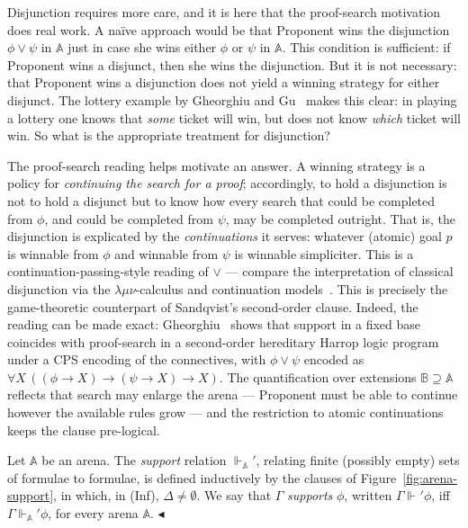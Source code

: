 \documentclass{lipics-v2021}
\newcommand{\fillBox}{\hfill$\blacktriangleleft$}
\newcommand{\supp}[1]{\Vdash_{#1}}
\newcommand{\arenasupp}[1]{\Vdash_{#1}'}  %
\newcommand{\arena}[1]{\mathbb{#1}}                     %
\begin{document}
Disjunction requires more care, and it is here that the proof-search motivation
does real work. A na\"ive approach would be that Proponent wins the disjunction $\phi \lor \psi$ in $\arena{A}$
just in case she wins either $\phi$ or $\psi$ in $\arena{A}$.
This condition is sufficient: if Proponent wins a disjunct, then she wins the disjunction. But it is not necessary: that Proponent wins a
disjunction does not yield a winning strategy for either disjunct. The lottery example by Gheorghiu and Gu~\cite{Gheorghiu2026KnowledgeBases} makes this clear: in playing a lottery one knows that \emph{some} ticket will win, but does not know \emph{which} ticket will win. So what is the appropriate treatment for disjunction?
 
The
proof-search reading helps motivate an answer. A winning strategy
is a policy for \emph{continuing the search for a proof}; accordingly, to hold a
disjunction is not to hold a disjunct but to know how every search that could
be completed from $\phi$, and could be completed from $\psi$, may be
completed outright. That is, the disjunction is explicated by the
\emph{continuations} it serves: whatever (atomic) goal $p$ is winnable from
$\phi$ and winnable from $\psi$ is winnable simpliciter. This is a
continuation-passing-style reading of $\lor$ --- compare the interpretation
of classical disjunction via the $\lambda\mu\nu$-calculus and continuation
models~\cite{PYM2001315,Pym_ReductiveLogic}. This is precisely the game-theoretic
counterpart of Sandqvist's second-order clause. Indeed, the reading can be
made exact: Gheorghiu~\cite{Gheorghiu2026SupportIsSearch} shows that support
in a fixed base coincides with proof-search in a second-order hereditary
Harrop logic program under a CPS encoding of the connectives, with
$\phi \lor \psi$ encoded as
$\forall X\,((\phi \to X) \to (\psi \to X) \to X)$. The quantification over
extensions $\arena{B} \supseteq \arena{A}$ reflects that search may enlarge
the arena --- Proponent must be able to continue however the available rules
grow --- and the restriction to atomic continuations keeps the clause
pre-logical.
\begin{definition}
\label{def:support_in_arena}
Let $\arena{A}$ be an arena. The \emph{support} relation
$\arenasupp{\arena{A}}$, relating finite (possibly empty) sets of formulae to
formulae, is defined inductively by the clauses of
Figure~\ref{fig:arena-support}, in which, in (Inf), $\Delta \neq \emptyset$. We say that
$\Gamma$ \emph{supports} $\phi$, written $\Gamma \arenasupp{} \phi$, iff
$\Gamma \arenasupp{\arena{A}} \phi$, for every arena $\arena{A}$. \fillBox
\end{definition}
\end{document}
